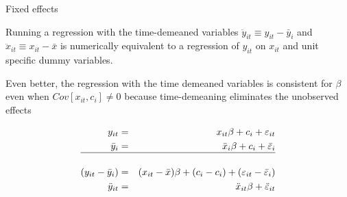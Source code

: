 \documentclass{beamer}
\begin{document}
\begin{frame}{Fixed effects}
	
Running a regression with the time-demeaned variables $\ddot{y}_{it}\equiv y_{it} - \bar{y}_i$ and $\ddot{x}_{it} \equiv x_{it} - \bar{x}$ is numerically equivalent to a regression of $y_{it}$ on $x_{it}$ and unit specific dummy variables.

\vspace{10mm}

Even better, the regression with the time demeaned variables is consistent for $\beta$ even when $Cov[x_{it},c_i]\neq 0$ because time-demeaning eliminates the unobserved effects

\begin{eqnarray*}
y_{it} &=& x_{it}\beta + c_i + \varepsilon_{it} \\
\bar{y}_i &=& \bar{x}_i \beta + c_i + \bar{\varepsilon}_{i}\\
\hline \\
(y_{it} - \bar{y}_i) &=& (x_{it} - \bar{x})\beta + (c_i - c_i) + (\varepsilon_{it} - \bar{\varepsilon}_i) \\
\ddot{y}_{it} &=& \ddot{x}_{it}\beta + \ddot{\varepsilon}_{it}
\end{eqnarray*}

\end{frame}
\end{document}
